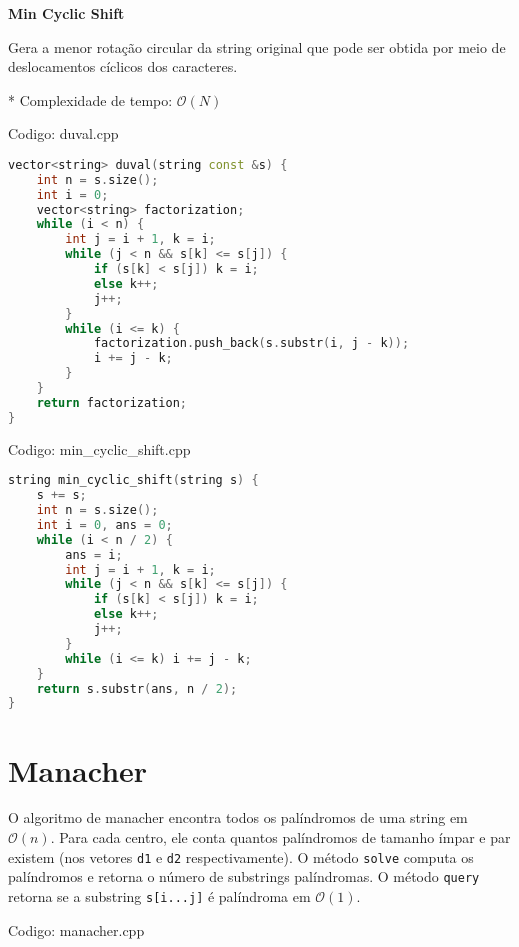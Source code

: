 \documentclass[10pt, a4paper, oneside]{book}
\begin{document}
\textbf{Min Cyclic Shift} 



Gera a menor rotação circular da string original que pode ser obtida por meio de deslocamentos cíclicos dos caracteres.



* Complexidade de tempo: $\mathcal{O}(N)$
\hfill

Codigo: duval.cpp

\begin{lstlisting}[language=C++]
vector<string> duval(string const &s) {
    int n = s.size();
    int i = 0;
    vector<string> factorization;
    while (i < n) {
        int j = i + 1, k = i;
        while (j < n && s[k] <= s[j]) {
            if (s[k] < s[j]) k = i;
            else k++;
            j++;
        }
        while (i <= k) {
            factorization.push_back(s.substr(i, j - k));
            i += j - k;
        }
    }
    return factorization;
}
\end{lstlisting}
\hfill

Codigo: min\_cyclic\_shift.cpp

\begin{lstlisting}[language=C++]
string min_cyclic_shift(string s) {
    s += s;
    int n = s.size();
    int i = 0, ans = 0;
    while (i < n / 2) {
        ans = i;
        int j = i + 1, k = i;
        while (j < n && s[k] <= s[j]) {
            if (s[k] < s[j]) k = i;
            else k++;
            j++;
        }
        while (i <= k) i += j - k;
    }
    return s.substr(ans, n / 2);
}
\end{lstlisting}
\hfill

\section{Manacher}


O algoritmo de manacher encontra todos os palíndromos de uma string em $\mathcal{O}(n)$. Para cada centro, ele conta quantos palíndromos de tamanho ímpar e par existem (nos vetores \texttt{d1} e \texttt{d2} respectivamente). O método \texttt{solve} computa os palíndromos e retorna o número de substrings palíndromas. O método \texttt{query} retorna se a substring \texttt{s[i...j]} é palíndroma em $\mathcal{O}(1)$.
\hfill

Codigo: manacher.cpp
\end{document}
